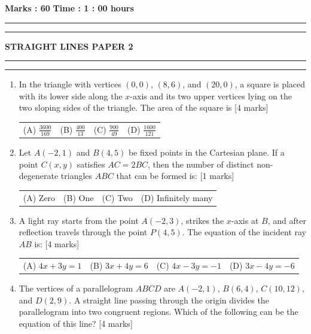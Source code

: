 \documentclass[11pt,a4paper]{article}
\begin{document}
\vspace{2mm}
\noindent \textbf{Marks : 60} \hfill \textbf{Time : 1 : 00 hours}
\noindent\rule{\linewidth}{1.1pt}\vspace{-1mm}\noindent\rule{\linewidth}{0.5pt}
{\centering \Large \textbf{STRAIGHT LINES PAPER 2}\par}
\noindent\rule{\linewidth}{1.1pt}\vspace{-1mm}\noindent\rule{\linewidth}{0.5pt}
\vspace{2mm}

\begin{enumerate}[resume]
\item In the triangle with vertices \((0,0)\), \((8,6)\), and \((20,0)\), a square is placed with its lower side along the \(x\)-axis and its two upper vertices lying on the two sloping sides of the triangle. The area of the square is \hfill [4 marks]
{\renewcommand{\arraystretch}{1.8}
\begin{tabularx}{\linewidth}{X X X X}
(A) \quad \(\frac{3600}{169}\) & (B) \quad \(\frac{400}{13}\) & (C) \quad \(\frac{900}{49}\) & (D) \quad \(\frac{1600}{121}\) \\[10pt]
\end{tabularx}}
\item Let \(A(-2,1)\) and \(B(4,5)\) be fixed points in the Cartesian plane. If a point \(C(x,y)\) satisfies \(AC=2BC\), then the number of distinct non-degenerate triangles \(ABC\) that can be formed is: \hfill [1 marks]
{\renewcommand{\arraystretch}{1.8}
\begin{tabularx}{\linewidth}{X X X X}
(A) \quad Zero & (B) \quad One & (C) \quad Two & (D) \quad Infinitely many \\[10pt]
\end{tabularx}}
\item A light ray starts from the point \(A(-2,3)\), strikes the \(x\)-axis at \(B\), and after reflection travels through the point \(P(4,5)\). The equation of the incident ray \(AB\) is: \hfill [4 marks]
{\renewcommand{\arraystretch}{1.8}
\begin{tabularx}{\linewidth}{X X X X}
(A) \quad \(4x+3y=1\) & (B) \quad \(3x+4y=6\) & (C) \quad \(4x-3y=-1\) & (D) \quad \(3x-4y=-6\) \\[10pt]
\end{tabularx}}
\item The vertices of a parallelogram \(ABCD\) are \(A(-2,1)\), \(B(6,4)\), \(C(10,12)\), and \(D(2,9)\). A straight line passing through the origin divides the parallelogram into two congruent regions. Which of the following can be the equation of this line? \hfill [4 marks]

\end{enumerate}
\end{document}
